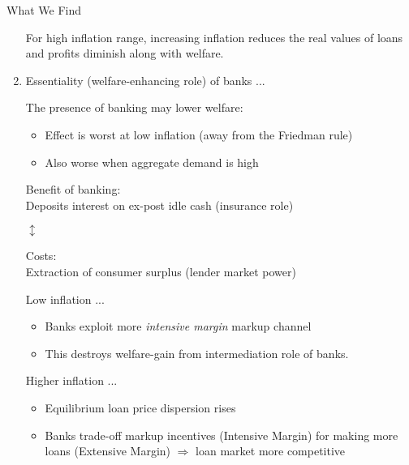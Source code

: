 \documentclass[10pt,english,slidetop,compress,
              blue,mathserif,color=option]{beamer}
\theoremstyle{plain}
\theoremstyle{definition}
\begin{document}
\begin{frame}[allowframebreaks]{What We Find}
\begin{enumerate}
        \bigskip

       For high inflation range, increasing inflation reduces the real values of loans and profits diminish along with welfare.

      \break

    \item \alert{Essentiality (welfare-enhancing role) of banks} ...
       \bigskip

       The presence of banking may lower welfare:
        \begin{itemize}
          \item Effect is worst at low inflation (away from the Friedman rule)
          \item Also worse when aggregate demand is high
        \end{itemize}

        \bigskip

        \begin{center}
                              \alert{Benefit of banking}: 
                              \\
            Deposits interest on ex-post idle cash (insurance role) 
            \medskip
          
                        $\updownarrow$
            \medskip

                              \alert{Costs}:
                              \\
            Extraction of consumer surplus (lender market power)
        \end{center}


        \break

       Low inflation ...
        \begin{itemize}
          \item Banks exploit more \emph{intensive margin} markup channel
          \item This destroys welfare-gain from intermediation role of banks.
        \end{itemize}
        \medskip

        Higher inflation ...
        \begin{itemize}
          \item Equilibrium loan price dispersion rises
          \item Banks trade-off markup incentives (Intensive Margin) for making more loans (Extensive Margin) $\Rightarrow$ loan market more competitive
        \end{itemize}


\end{enumerate}
\end{frame}
\end{document}
